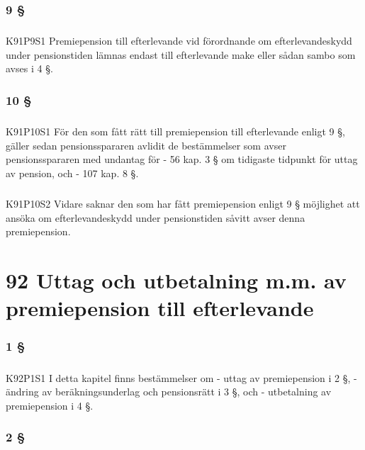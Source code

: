 \documentclass[a4paper,notitlepage,openany,10pt]{book}
\begin{document}
\subsection*{9 §}
\paragraph*{}
{\tiny K91P9S1}
Premiepension till efterlevande vid förordnande om efterlevandeskydd under pensionstiden lämnas endast till efterlevande make eller sådan sambo som avses i 4 §.
\subsection*{10 §}
\paragraph*{}
{\tiny K91P10S1}
För den som fått rätt till premiepension till efterlevande enligt 9 §, gäller sedan pensionsspararen avlidit de bestämmelser som avser pensionsspararen med undantag för
\newline - 56 kap. 3 § om tidigaste tidpunkt för uttag av pension, och
\newline - 107 kap. 8 §.
\paragraph*{}
{\tiny K91P10S2}
Vidare saknar den som har fått premiepension enligt 9 § möjlighet att ansöka om efterlevandeskydd under pensionstiden såvitt avser denna premiepension.
\chapter*{92 Uttag och utbetalning m.m. av premiepension till efterlevande}
\subsection*{1 §}
\paragraph*{}
{\tiny K92P1S1}
I detta kapitel finns bestämmelser om
\newline - uttag av premiepension i 2 §,
\newline - ändring av beräkningsunderlag och pensionsrätt i 3 §, och
\newline - utbetalning av premiepension i 4 §.
\subsection*{2 §}
\end{document}
